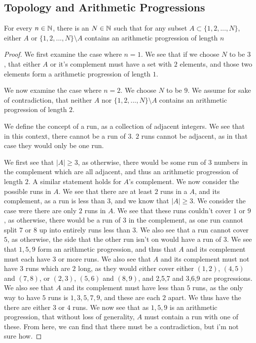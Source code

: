 \subsection{Topology and Arithmetic Progressions}




\begin{majorEx}
  For every $n \in \mathbb{N}$, there is an $N \in \mathbb{N}$ such that for any
  subset $A \subset \{1,2,...,N\}$, either $A$ or $\{1,2,...,N\}
  \setminus A$ contains an arithmetic progression of length $n$
\end{majorEx}

\begin{proof}
  We first examine the case where $n=1$. We see that if we choose $N$
  to be $3$, that either $A$ or it's complement must have a set with
  $2$ elements, and those two elements form a arithmetic progression
  of length $1$.

  We now examine the case where $n=2$. We choose $N$ to
  be $9$. We assume for sake of contradiction, that neither $A$ nor 
  $\{1,2,...,N\} \setminus A$ contains an arithmetic progression 
  of length $2$. 

  We define the concept of a run, as a collection of adjacent
  integers. We see that in this context, there cannot be a run of
  $3$. $2$ runs cannot be adjacent, as in that case they would only be
  one run.

  We first see that $|A|\geq 3$, as otherwise, there
  would be some run of $3$ numbers in the complement which 
  are all adjacent, and thus an
  arithmetic progression of length $2$. A similar statement holds for
  $A$'s complement. We now consider the possible
  runs in $A$. We see that there are at least $2$ runs in a $A$, and
  its complement, as a run is less than $3$, and we know that $|A|\geq
  3$. We consider the case were there are only $2$ runs in $A$. 
  We see that these runs couldn't cover $1$ or $9$, as otherwise,
  there would be a run of $3$ in the complement, as one run cannot
  split $7$ or $8$ up into entirely runs less than $3$. We also see
  that a run cannot cover $5$, as otherwise, the side that the other
  run isn't on would have a run of $3$. We see that $1,5,9$ form an
  arithmetic progression, and thus that $A$ and its complement must
  each have $3$ or more runs. We also see that $A$ and its complement
  must not have $3$ runs which are $2$ long, as they would either
  cover either $(1,2)$, $(4,5)$ and $(7,8)$, or $(2,3)$, $(5,6)$ and
  $(8,9)$, and 2,5,7 and 3,6,9 are progressions. We also see that $A$
  and its complement must have less than $5$ runs, as the only way to
  have $5$ runs is $1,3,5,7,9$, and these are each $2$ apart. We thus
  have the there are either $3$ or $4$ runs. We now see that as
  $1,5,9$ is an arithmetic progression, that without loss of
  generality, $A$ must contain a run with one of these. From here, we
  can find that there must be a contradiction, but i'm not sure how.
\end{proof}


